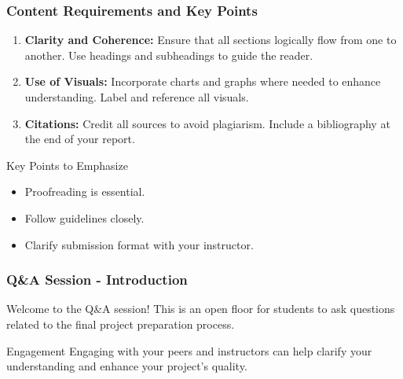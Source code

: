 \documentclass[aspectratio=169]{beamer}
\begin{document}
\begin{frame}[fragile]
    \frametitle{Content Requirements and Key Points}
    \begin{enumerate}
        \item \textbf{Clarity and Coherence:} Ensure that all sections logically flow from one to another. Use headings and subheadings to guide the reader.
        \item \textbf{Use of Visuals:} Incorporate charts and graphs where needed to enhance understanding. Label and reference all visuals.
        \item \textbf{Citations:} Credit all sources to avoid plagiarism. Include a bibliography at the end of your report.
    \end{enumerate}
    
    \begin{block}{Key Points to Emphasize}
        \begin{itemize}
            \item Proofreading is essential.
            \item Follow guidelines closely.
            \item Clarify submission format with your instructor.
        \end{itemize}
    \end{block}
\end{frame}

\begin{frame}[fragile]
    \frametitle{Q\&A Session - Introduction}
    Welcome to the Q\&A session! This is an open floor for students to ask questions related to the final project preparation process. 
    \begin{block}{Engagement}
        Engaging with your peers and instructors can help clarify your understanding and enhance your project's quality.
    \end{block}
\end{frame}
\end{document}
